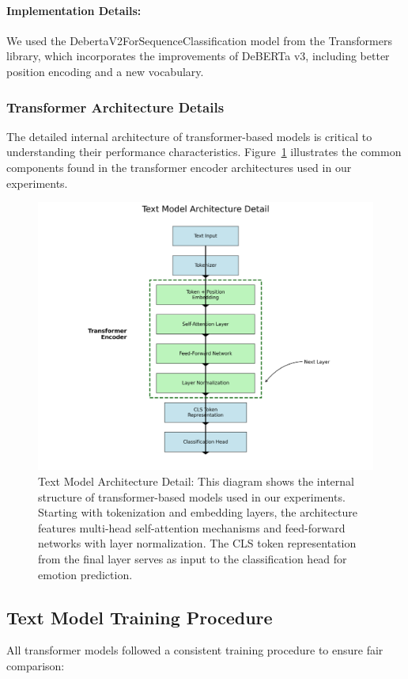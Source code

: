 \documentclass[12pt]{article}
\begin{document}
\paragraph{Implementation Details:}
We used the DebertaV2ForSequenceClassification model from the Transformers library, which incorporates the improvements of DeBERTa v3, including better position encoding and a new vocabulary.

\subsubsection{Transformer Architecture Details}
The detailed internal architecture of transformer-based models is critical to understanding their performance characteristics. Figure~\ref{fig:text_model_architecture} illustrates the common components found in the transformer encoder architectures used in our experiments.

\begin{figure}[h]
    \centering
    \includegraphics[width=0.85\linewidth]{Figures/text_model_architecture.png}
    \caption{Text Model Architecture Detail: This diagram shows the internal structure of transformer-based models used in our experiments. Starting with tokenization and embedding layers, the architecture features multi-head self-attention mechanisms and feed-forward networks with layer normalization. The CLS token representation from the final layer serves as input to the classification head for emotion prediction.}
    \label{fig:text_model_architecture}
\end{figure}

\subsection{Text Model Training Procedure}
All transformer models followed a consistent training procedure to ensure fair comparison:
\end{document}
